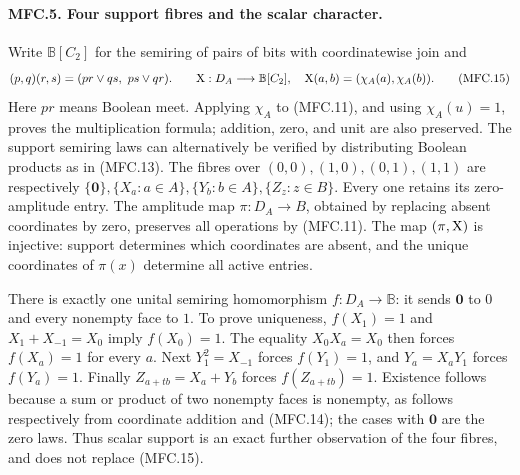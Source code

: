 \paragraph{MFC.5. Four support fibres and the scalar character.}
Write \(\mathbb B[C_2]\) for the semiring of pairs of bits with
coordinatewise join and
\[
 (p,q)(r,s)=(pr\vee qs,\ ps\vee qr).
 \qquad
 \mathrm{X}:D_A\longrightarrow\mathbb B[C_2],\quad
 \mathrm{X}(a,b)=(\chi_A(a),\chi_A(b)).                          \tag{MFC.15}
\]
Here \(pr\) means Boolean meet. Applying \(\chi_A\) to (MFC.11),
and using \(\chi_A(u)=1\), proves the multiplication formula;
addition, zero, and unit are also preserved. The support semiring
laws can alternatively be verified by distributing Boolean products
as in (MFC.13). The fibres over \((0,0),(1,0),(0,1),(1,1)\)
are respectively \(\{\mathbf0\},\{X_a:a\in A\},
\{Y_b:b\in A\},\{Z_z:z\in B\}\). Every one retains its zero-amplitude
entry. The amplitude map
\(\pi:D_A\to B\), obtained by replacing absent coordinates by zero,
preserves all operations by (MFC.11). The map \((\pi,\mathrm{X})\) is
injective: support determines which coordinates are absent, and the
unique coordinates of \(\pi(x)\) determine all active entries.

There is exactly one unital semiring homomorphism \(f:D_A\to\mathbb B\):
it sends \(\mathbf0\) to \(0\) and every nonempty face to \(1\).
To prove uniqueness, \(f(X_1)=1\) and
\(X_1+X_{-1}=X_0\) imply \(f(X_0)=1\).
The equality \(X_0X_a=X_0\) then forces \(f(X_a)=1\) for every \(a\).
Next \(Y_1^2=X_{-1}\) forces \(f(Y_1)=1\), and
\(Y_a=X_aY_1\) forces \(f(Y_a)=1\).
Finally \(Z_{a+tb}=X_a+Y_b\) forces \(f(Z_{a+tb})=1\).
Existence follows because a sum or product of two nonempty faces
is nonempty, as follows respectively from coordinate addition and
(MFC.14); the cases with \(\mathbf0\) are the zero laws.
Thus scalar support is an exact further observation of the four
fibres, and does not replace (MFC.15).

